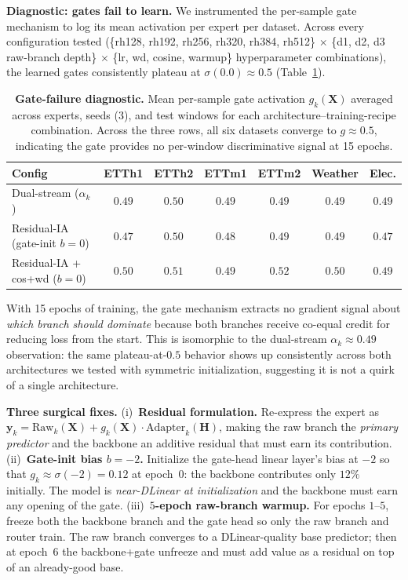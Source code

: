 \documentclass{article}
\begin{document}
\textbf{Diagnostic: gates fail to learn.} We instrumented the per-sample gate mechanism to log its mean activation per expert per dataset. Across every configuration tested (\{rh128, rh192, rh256, rh320, rh384, rh512\} $\times$ \{d1, d2, d3 raw-branch depth\} $\times$ \{lr, wd, cosine, warmup\} hyperparameter combinations), the learned gates consistently plateau at $\sigma(0.0){\approx}0.5$ (Table~\ref{tab:gate_pathology}).

\begin{table}[!htbp]
\centering
\caption{\textbf{Gate-failure diagnostic.} Mean per-sample gate activation $g_k(\mathbf{X})$ averaged across experts, seeds (3), and test windows for each architecture--training-recipe combination. Across the three rows, all six datasets converge to $g \approx 0.5$, indicating the gate provides no per-window discriminative signal at 15 epochs.}
\label{tab:gate_pathology}
\small
\begin{tabular}{@{}lcccccc@{}}
\toprule
Config & ETTh1 & ETTh2 & ETTm1 & ETTm2 & Weather & Elec. \\
\midrule
Dual-stream ($\alpha_k$)             & $0.49$ & $0.50$ & $0.49$ & $0.49$ & $0.49$ & $0.49$ \\
Residual-IA (gate-init $b{=}0$)      & $0.47$ & $0.50$ & $0.48$ & $0.49$ & $0.49$ & $0.47$ \\
Residual-IA + cos+wd ($b{=}0$)       & $0.50$ & $0.51$ & $0.49$ & $0.52$ & $0.50$ & $0.49$ \\
\bottomrule
\end{tabular}
\end{table}

With 15 epochs of training, the gate mechanism extracts no gradient signal about \emph{which branch should dominate} because both branches receive co-equal credit for reducing loss from the start. This is isomorphic to the dual-stream $\alpha_k \approx 0.49$ observation: the same plateau-at-$0.5$ behavior shows up consistently across both architectures we tested with symmetric initialization, suggesting it is not a quirk of a single architecture.

\textbf{Three surgical fixes.}
(i)~\textbf{Residual formulation.} Re-express the expert as $\mathbf{y}_k = \text{Raw}_k(\mathbf{X}) + g_k(\mathbf{X})\cdot\text{Adapter}_k(\mathbf{H})$, making the raw branch the \emph{primary predictor} and the backbone an additive residual that must earn its contribution.
(ii)~\textbf{Gate-init bias $b{=}{-}2$.} Initialize the gate-head linear layer's bias at $-2$ so that $g_k \approx \sigma({-}2){=}0.12$ at epoch~$0$: the backbone contributes only $12\%$ initially. The model is \emph{near-DLinear at initialization} and the backbone must earn any opening of the gate.
(iii)~\textbf{$5$-epoch raw-branch warmup.} For epochs $1$--$5$, freeze both the backbone branch and the gate head so only the raw branch and router train. The raw branch converges to a DLinear-quality base predictor; then at epoch~$6$ the backbone+gate unfreeze and must add value as a residual on top of an already-good base.
\end{document}
